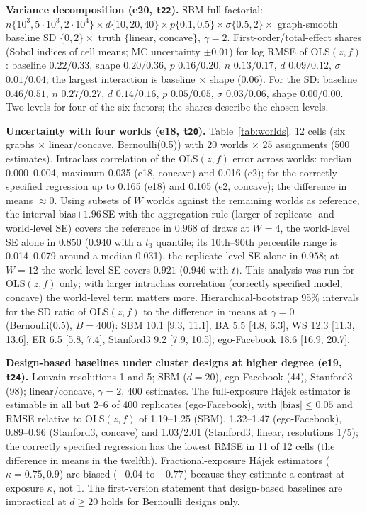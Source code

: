\textbf{Variance decomposition (e20, \texttt{t22}).} SBM full factorial: $n\{10^3,5\cdot10^3,2\cdot10^4\}\times d\{10,20,40\}\times p\{0.1,0.5\}\times\sigma\{0.5,2\}\times$ graph-smooth baseline SD $\{0,2\}\times$ truth $\{$linear, concave$\}$, $\gamma=2$. First-order/total-effect shares (Sobol indices of cell means; MC uncertainty $\pm0.01$) for log RMSE of OLS$(z,f)$: baseline $0.22/0.33$, shape $0.20/0.36$, $p$ $0.16/0.20$, $n$ $0.13/0.17$, $d$ $0.09/0.12$, $\sigma$ $0.01/0.04$; the largest interaction is baseline $\times$ shape (0.06). For the SD: baseline $0.46/0.51$, $n$ $0.27/0.27$, $d$ $0.14/0.16$, $p$ $0.05/0.05$, $\sigma$ $0.03/0.06$, shape $0.00/0.00$. Two levels for four of the six factors; the shares describe the chosen levels.

\textbf{Uncertainty with four worlds (e18, \texttt{t20}).} Table~\ref{tab:worlds}.  12 cells (six graphs $\times$ linear/concave, Bernoulli(0.5)) with 20 worlds $\times$ 25 assignments (500 estimates). Intraclass correlation of the OLS$(z,f)$ error across worlds: median 0.000--0.004, maximum 0.035 (e18, concave) and 0.016 (e2); for the correctly specified regression up to 0.165 (e18) and 0.105 (e2, concave); the difference in means $\approx0$. Using subsets of $W$ worlds against the remaining worlds as reference, the interval bias$\pm1.96\,$SE with the aggregation rule (larger of replicate- and world-level SE) covers the reference in $0.968$ of draws at $W=4$, the world-level SE alone in $0.850$ ($0.940$ with a $t_3$ quantile; its 10th--90th percentile range is 0.014--0.079 around a median 0.031), the replicate-level SE alone in $0.958$; at $W=12$ the world-level SE covers $0.921$ ($0.946$ with $t$). This analysis was run for OLS$(z,f)$ only; with larger intraclass correlation (correctly specified model, concave) the world-level term matters more. Hierarchical-bootstrap 95\% intervals for the SD ratio of OLS$(z,f)$ to the difference in means at $\gamma=0$ (Bernoulli(0.5), $B=400$): SBM 10.1 [9.3, 11.1], BA 5.5 [4.8, 6.3], WS 12.3 [11.3, 13.6], ER 6.5 [5.8, 7.4], Stanford3 9.2 [7.9, 10.5], ego-Facebook 18.6 [16.9, 20.7].

\textbf{Design-based baselines under cluster designs at higher degree (e19, \texttt{t24}).} Louvain resolutions 1 and 5; SBM ($d=20$), ego-Facebook (44), Stanford3 (98); linear/concave, $\gamma=2$, 400 estimates. The full-exposure Hájek estimator is estimable in all but 2--6 of 400 replicates (ego-Facebook), with $|\text{bias}|\le0.05$ and RMSE relative to OLS$(z,f)$ of 1.19--1.25 (SBM), 1.32--1.47 (ego-Facebook), 0.89--0.96 (Stanford3, concave) and 1.03/2.01 (Stanford3, linear, resolutions 1/5); the correctly specified regression has the lowest RMSE in 11 of 12 cells (the difference in means in the twelfth). Fractional-exposure Hájek estimators ($\kappa=0.75,0.9$) are biased ($-0.04$ to $-0.77$) because they estimate a contrast at exposure $\kappa$, not 1. The first-version statement that design-based baselines are impractical at $d\ge20$ holds for Bernoulli designs only.

